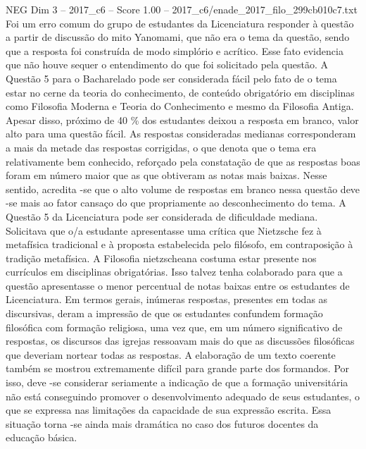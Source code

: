 \begin{textsample}{NEG Dim 3 – 2017\_c6 – Score 1.00 – 2017\_c6/enade\_2017\_filo\_299cb010c7.txt}
Foi um erro comum do grupo de estudantes da Licenciatura responder à questão a partir de discussão do mito Yanomami, que não era o tema da questão, sendo que a resposta foi construída de modo simplório e acrítico.
Esse fato evidencia que não houve sequer o entendimento do que foi solicitado pela questão.
A Questão 5 para o Bacharelado pode ser considerada fácil pelo fato de o tema estar no cerne da teoria do conhecimento, de conteúdo obrigatório em disciplinas como Filosofia Moderna e Teoria do Conhecimento e mesmo da Filosofia Antiga.
Apesar disso, próximo de 40 \% dos estudantes deixou a resposta em branco, valor alto para uma questão fácil.
As respostas consideradas medianas corresponderam a mais da metade das respostas corrigidas, o que denota que o tema era relativamente bem conhecido, reforçado pela constatação de que as respostas boas foram em número maior que as que obtiveram as notas mais baixas.
Nesse sentido, acredita -se que o alto volume de respostas em branco nessa questão deve -se mais ao fator cansaço do que propriamente ao desconhecimento do tema.
A Questão 5 da Licenciatura pode ser considerada de dificuldade mediana.
Solicitava que o/a estudante apresentasse uma crítica que Nietzsche fez à metafísica tradicional e à proposta estabelecida pelo filósofo, em contraposição à tradição metafísica.
A Filosofia nietzscheana costuma estar presente nos currículos em disciplinas obrigatórias.
Isso talvez tenha colaborado para que a questão apresentasse o menor percentual de notas baixas entre os estudantes de Licenciatura.
Em termos gerais, inúmeras respostas, presentes em todas as discursivas, deram a impressão de que os estudantes confundem formação filosófica com formação religiosa, uma vez que, em um número significativo de respostas, os discursos das igrejas ressoavam mais do que as discussões filosóficas que deveriam nortear todas as respostas.
A elaboração de um texto coerente também se mostrou extremamente difícil para grande parte dos formandos.
Por isso, deve -se considerar seriamente a indicação de que a formação universitária não está conseguindo promover o desenvolvimento adequado de seus estudantes, o que se expressa nas limitações da capacidade de sua expressão escrita.
Essa situação torna -se ainda mais dramática no caso dos futuros docentes da educação básica.

\end{textsample}
